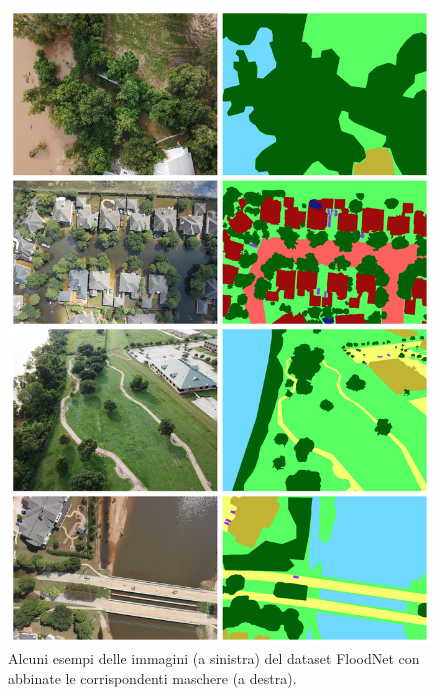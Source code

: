 \begin{figure}
    \hspace*{-0.3cm}
    \includegraphics[scale=0.25]{img/esempi_img_ds.jpg}
    \caption{Alcuni esempi delle immagini (a sinistra) del dataset FloodNet con abbinate le corrispondenti maschere (a destra).}
    \label{fig:example_ds}
\end{figure}


    

    
    
    


